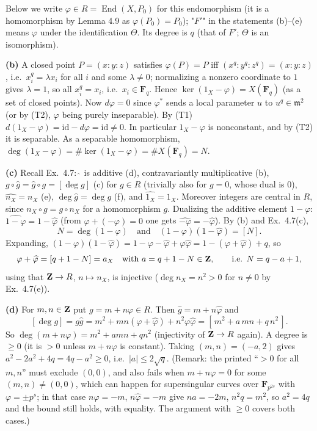\documentclass[11pt]{article}
\begin{document}
Below we write $\varphi\in R=\operatorname{End}(X,P_0)$ for this endomorphism (it is a homomorphism by Lemma 4.9 as $\varphi(P_0)=P_0$); "$F'$" in the statements (b)--(e) means $\varphi$ under the identification $\Theta$. Its degree is $q$ (that of $F'$; $\Theta$ is an isomorphism).

\textbf{(b)} A closed point $P=(x:y:z)$ satisfies $\varphi(P)=P$ iff $(x^q:y^q:z^q)=(x:y:z)$, i.e.\ $x_i^q=\lambda x_i$ for all $i$ and some $\lambda\ne0$; normalizing a nonzero coordinate to $1$ gives $\lambda=1$, so all $x_i^q=x_i$, i.e.\ $x_i\in\mathbf F_q$. Hence $\ker(1_X-\varphi)=X(\mathbf F_q)$ (as a set of closed points). Now $d\varphi=0$ since $\varphi^*$ sends a local parameter $u$ to $u^q\in\mathfrak m^2$ (or by (T2), $\varphi$ being purely inseparable). By (T1) $d(1_X-\varphi)=\mathrm{id}-d\varphi=\mathrm{id}\neq0$. In particular $1_X-\varphi$ is nonconstant, and by (T2) it is separable. As a separable homomorphism, $\deg(1_X-\varphi)=\#\ker(1_X-\varphi)=\#X(\mathbf F_q)=N$.

\textbf{(c)} Recall Ex.~4.7: $\widehat{\ }$ is additive (d), contravariantly multiplicative (b), $g\circ\widehat g=\widehat g\circ g=[\deg g]$ (c) for $g\in R$ (trivially also for $g=0$, whose dual is $0$), $\widehat{n_X}=n_X$ (e), $\deg\widehat g=\deg g$ (f), and $\widehat{1_X}=1_X$. Moreover integers are central in $R$, since $n_X\circ g=g\circ n_X$ for a homomorphism $g$. Dualizing the additive element $1-\varphi$: $\widehat{1-\varphi}=1-\widehat\varphi$ (from $\varphi+(-\varphi)=0$ one gets $\widehat{-\varphi}=-\widehat\varphi$). By (b) and Ex.~4.7(c),
\[
N=\deg(1-\varphi)\quad\text{and}\quad(1-\varphi)(1-\widehat\varphi)=[N].
\]
Expanding, $(1-\varphi)(1-\widehat\varphi)=1-\varphi-\widehat\varphi+\varphi\widehat\varphi=1-(\varphi+\widehat\varphi)+q$, so
\[
\varphi+\widehat\varphi=[q+1-N]=a_X\quad\text{with }a=q+1-N\in\mathbf Z,\qquad\text{i.e. }N=q-a+1,
\]
using that $\mathbf Z\to R$, $n\mapsto n_X$, is injective ($\deg n_X=n^2>0$ for $n\neq0$ by Ex.~4.7(e)).

\textbf{(d)} For $m,n\in\mathbf Z$ put $g=m+n\varphi\in R$. Then $\widehat g=m+n\widehat\varphi$ and
\[
[\deg g]=g\widehat g=m^2+mn(\varphi+\widehat\varphi)+n^2\varphi\widehat\varphi=[\,m^2+a\,mn+q\,n^2\,].
\]
So $\deg(m+n\varphi)=m^2+amn+qn^2$ (injectivity of $\mathbf Z\to R$ again). A degree is $\ge0$ (it is $>0$ unless $m+n\varphi$ is constant). Taking $(m,n)=(-a,2)$ gives $a^2-2a^2+4q=4q-a^2\ge0$, i.e.\ $|a|\le2\sqrt q$. (Remark: the printed ``$>0$ for all $m,n$'' must exclude $(0,0)$, and also fails when $m+n\varphi=0$ for some $(m,n)\neq(0,0)$, which can happen for supersingular curves over $\mathbf F_{p^{2s}}$ with $\varphi=\pm p^s$; in that case $n\varphi=-m$, $n\widehat\varphi=-m$ give $na=-2m$, $n^2q=m^2$, so $a^2=4q$ and the bound still holds, with equality. The argument with $\ge0$ covers both cases.)
\end{document}
